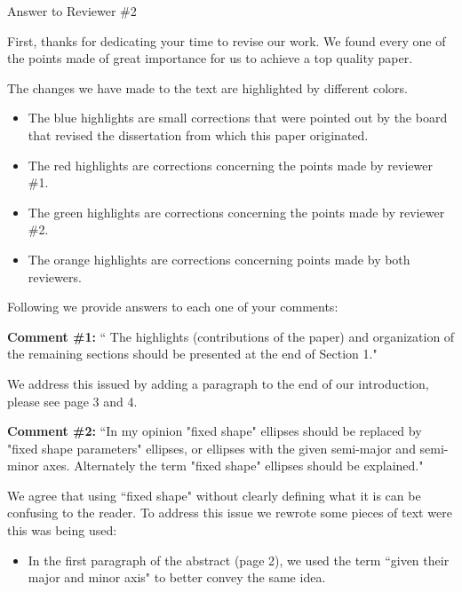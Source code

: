\documentclass[letterpaper]{letter}
\begin{document}
	
		
		\begin{letter}{}

		\opening{Answer to Reviewer \#2}
		
		First, thanks for dedicating your time to revise our work. We found every one of the points made of great importance for us to achieve a top quality paper.
		
		The changes we have made to the text are highlighted by different colors. 
		\begin{itemize}
			\item The {\color{blue} blue} highlights are small corrections that were pointed out by the board that revised the dissertation from which this paper originated.
			
			\item The {\color{Red} red} highlights are corrections concerning the points made by reviewer \#1.
			
			\item The {\color{Green} green} highlights are corrections concerning the points made by reviewer \#2.
			
			\item The {\color{Orange} orange} highlights are corrections concerning points made by both reviewers.
		\end{itemize}
		 
		Following we provide answers to each one of your comments:
		
		\textbf{Comment \#1:} `` The highlights (contributions of the paper) and organization of the remaining sections should be presented at the end of Section 1."
		
		We address this issued by adding a paragraph to the end of our introduction, please see page 3 and 4.
		
		\textbf{Comment \#2:} ``In my opinion "fixed shape" ellipses should be replaced by "fixed shape parameters" ellipses, or ellipses with the given semi-major and semi-minor axes. Alternately the term "fixed shape" ellipses should be explained."
		
		We agree that using ``fixed shape" without clearly defining what it is can be confusing to the reader. To address this issue we rewrote some pieces of text were this was being used:
		\begin{itemize}
			\item In the first paragraph of the abstract (page 2), we used the term ``given their major and minor axis" to better convey the same idea.
			

\end{itemize}
\end{letter}
\end{document}
